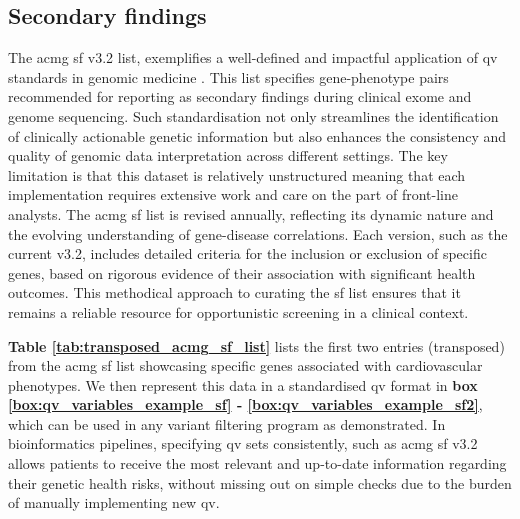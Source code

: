 \subsection{Secondary findings}
\label{sec:sf}
The \ac{acmg} \ac{sf} v3.2 list, exemplifies a well-defined and impactful application of \ac{qv} standards in genomic medicine 
\cite{miller2023acmg}. 
This list specifies gene-phenotype pairs recommended for reporting as secondary findings during clinical exome and genome sequencing. 
Such standardisation not only streamlines the identification of clinically actionable genetic information but also enhances the consistency and quality of genomic data interpretation across different settings.
The key limitation is that this dataset is relatively unstructured meaning that each implementation requires extensive work and care on the part of front-line analysts. 
The \ac{acmg} \ac{sf} list is revised annually, reflecting its dynamic nature and the evolving understanding of gene-disease correlations. 
Each version, such as the current v3.2, includes detailed criteria for the inclusion or exclusion of specific genes, based on rigorous evidence of their association with significant health outcomes. 
This methodical approach to curating the \ac{sf}  list ensures that it remains a reliable resource for opportunistic screening in a clinical context.

\textbf{Table \ref{tab:transposed_acmg_sf_list}} lists the first two entries (transposed) from the \ac{acmg} \ac{sf} list showcasing specific genes associated with cardiovascular phenotypes.
We then represent this data in a standardised \ac{qv} format in
\textbf{box
\ref{box:qv_variables_example_sf} - 
\ref{box:qv_variables_example_sf2}},
which can be used in any variant filtering program as demonstrated.
In bioinformatics pipelines, specifying \ac{qv} sets consistently, such as \ac{acmg} \ac{sf} v3.2 allows patients to receive the most relevant and up-to-date information regarding their genetic health risks, without missing out on simple checks due to the burden of manually implementing new \ac{qv}. 

